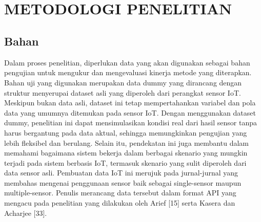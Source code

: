 \chapter[METODOLOGI PENELITIAN]{\\ METODOLOGI PENELITIAN}
\section{Bahan}
Dalam proses penelitian, diperlukan data yang akan digunakan sebagai bahan pengujian untuk mengukur dan mengevaluasi kinerja metode yang diterapkan. Bahan uji yang digunakan merupakan data dummy yang dirancang dengan struktur menyerupai dataset asli yang diperoleh dari perangkat sensor IoT. Meskipun bukan data asli, dataset ini tetap mempertahankan variabel dan pola data yang umumnya ditemukan pada sensor IoT. Dengan menggunakan dataset dummy, penelitian ini dapat mensimulasikan kondisi real dari hasil sensor tanpa harus bergantung pada data aktual, sehingga memungkinkan pengujian yang lebih fleksibel dan berulang. Selain itu, pendekatan ini juga membantu dalam memahami bagaimana sistem bekerja dalam berbagai skenario yang mungkin terjadi pada sistem berbasis IoT, termasuk skenario yang sulit diperoleh dari data sensor asli. Pembuatan data IoT ini merujuk pada jurnal-jurnal yang membahas mengenai penggunaan sensor baik sebagai single-sensor maupun multiple-sensor. Penulis merancang data tersebut dalam format API yang mengacu pada penelitian yang dilakukan oleh Arief [15] serta Kasera dan Acharjee [33]. 

